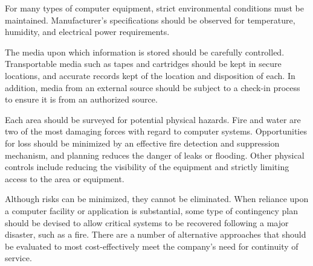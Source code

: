 \begin{htmllist}

    
    For many types of computer equipment, strict environmental conditions
    must be maintained. Manufacturer's specifications should be observed
    for temperature, humidity, and electrical power requirements.


    
    The media upon which information is stored should be carefully
    controlled. Transportable media such as tapes and cartridges should be
    kept in secure locations, and accurate records kept of the location and
    disposition of each. In addition, media from an external source should
    be subject to a check-in process to ensure it is from an authorized
    source.


    
    Each area should be surveyed for potential physical hazards. Fire and
    water are two of the most damaging forces with regard to computer
    systems. Opportunities for loss should be minimized by an effective
    fire detection and suppression mechanism, and planning reduces the
    danger of leaks or flooding. Other physical controls include reducing
    the visibility of the equipment and strictly limiting access to the
    area or equipment.


    
    Although risks can be minimized, they cannot be eliminated. When
    reliance upon a computer facility or application is substantial, some
    type of contingency plan should be devised to allow critical systems to
    be recovered following a major disaster, such as a fire. There are a
    number of alternative approaches that should be evaluated to most
    cost-effectively meet the company's need for continuity of service.



\end{htmllist}
